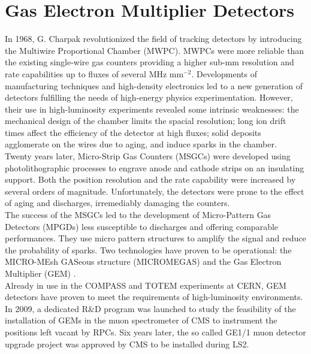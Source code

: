 \chapter{Gas Electron Multiplier Detectors}
\label{chap:II-1-gem}

  In 1968, G. Charpak revolutionized the field of tracking detectors by introducing the Multiwire Proportional Chamber (MWPC). MWPCs were more reliable than the existing single-wire gas counters providing a higher sub-mm resolution and rate capabilities up to fluxes of several MHz mm$^{-2}$. Developments of manufacturing techniques and high-density electronics led to a new generation of detectors fulfilling the needs of high-energy physics experimentation. However, their use in high-luminosity experiments revealed some intrinsic weaknesses: the mechanical design of the chamber limits the spacial resolution; long ion drift times affect the efficiency of the detector at high fluxes; solid deposits agglomerate on the wires due to aging, and induce sparks in the chamber. \\

  Twenty years later, Micro-Strip Gas Counters (MSGCs) \cite{Alunni:254631} were developed using photolithographic processes to engrave anode and cathode strips on an insulating support. Both the position resolution and the rate capability were increased by several orders of magnitude. Unfortunately, the detectors were prone to the effect of aging and discharges, irremediably damaging the counters. \\

  The success of the MSGCs led to the development of Micro-Pattern Gas Detectors (MPGDs) less susceptible to discharges and offering comparable performances. They use micro pattern structures to amplify the signal and reduce the probability of sparks. Two technologies have proven to be operational: the MICRO-MEsh GASeous structure (MICROMEGAS) \cite{Giomataris:299159} and the Gas Electron Multiplier (GEM) \cite{SAULI1997531}. \\

  Already in use in the COMPASS and TOTEM experiments at CERN, GEM detectors have proven to meet the requirements of high-luminosity environments. In 2009, a dedicated R\&D program was launched to study the feasibility of the installation of GEMs in the muon spectrometer of CMS to instrument the positions left vacant by RPCs. Six years later, the so called GE1/1 muon detector upgrade project was approved by CMS to be installed during LS2.

